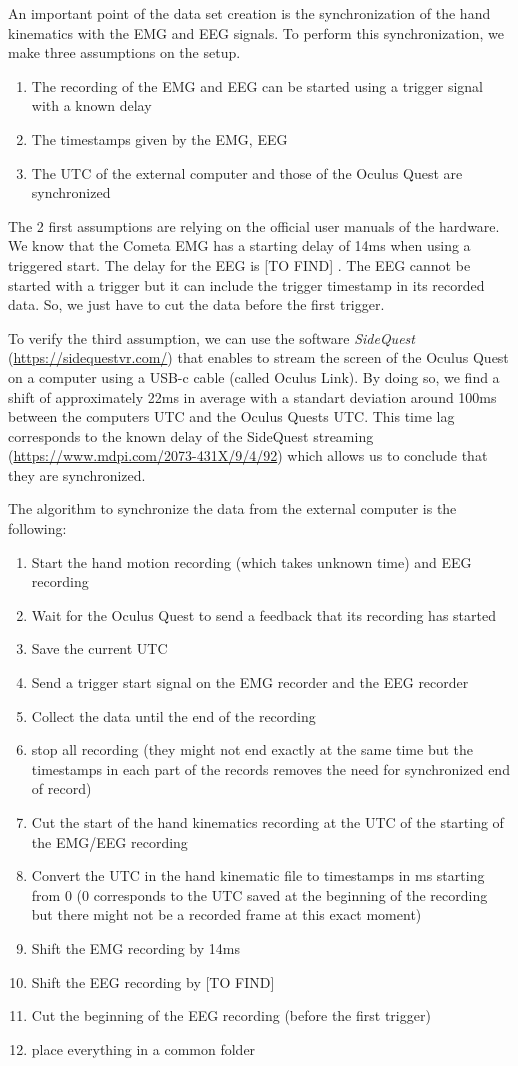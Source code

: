 \documentclass{article}
\begin{document}
An important point of the data set creation is the synchronization of the hand kinematics with the EMG and EEG signals. To perform this synchronization, we make three assumptions on the setup.
\begin{enumerate}
	\item The recording of the EMG and EEG can be started using a trigger signal with a known delay
	\item The timestamps given by the EMG, EEG
	\item The UTC of the external computer and those of the Oculus Quest are synchronized
\end{enumerate}
The 2 first assumptions are relying on the official user manuals of the hardware. We know that the Cometa EMG has a starting delay of 14ms when using a triggered start. The delay for the EEG is \color{red} [TO FIND] \color{black}. The EEG cannot be started with a trigger but it can include the trigger timestamp in its recorded data. So, we just have to cut the data before the first trigger.

To verify the third assumption, we can use the software \textit{SideQuest} (\url{https://sidequestvr.com/}) that enables to stream the screen of the Oculus Quest on a computer using a USB-c cable (called Oculus Link). By doing so, we find a shift of approximately 22ms in average with a standart deviation around 100ms between the computers UTC and the Oculus Quests UTC. This time lag corresponds to the known delay of the SideQuest streaming (\url{https://www.mdpi.com/2073-431X/9/4/92}) which allows us to conclude that they are synchronized.

The algorithm to synchronize the data from the external computer is the following:
\begin{enumerate}
	\item Start the hand motion recording (which takes unknown time) and EEG recording
	\item Wait for the Oculus Quest to send a feedback that its recording has started
	\item Save the current UTC
	\item Send a trigger start signal on the EMG recorder and the EEG recorder
	\item Collect the data until the end of the recording
	\item stop all recording (they might not end exactly at the same time but the timestamps in each part of the records removes the need for synchronized end of record)
	\item Cut the start of the hand kinematics recording at the UTC of the starting of the EMG/EEG recording
	\item Convert the UTC in the hand kinematic file to timestamps in ms starting from 0 (0 corresponds to the UTC saved at the beginning of the recording but there might not be a recorded frame at this exact moment)
	\item Shift the EMG recording by 14ms
	\item Shift the EEG recording by \color{red} [TO FIND] \color{black}
	\item Cut the beginning of the EEG recording (before the first trigger)
	\item place everything in a common folder
\end{enumerate}
\end{document}
